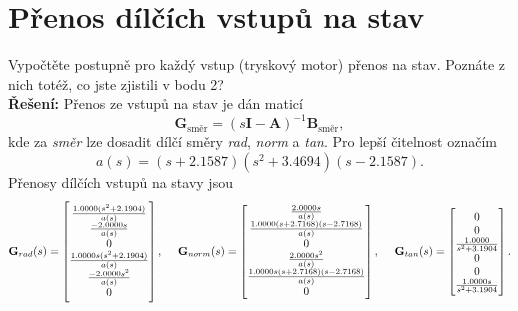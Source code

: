 \documentclass[twoside]{article}
\begin{document}
\section{Přenos dílčích vstupů na stav}
\label{sec:ukol3}
Vypočtěte postupně pro každý vstup (tryskový motor) přenos na stav. Poznáte z nich totéž, co jste zjistili
v bodu 2? \\
\textbf{Řešení:}
Přenos ze vstupů na stav je dán maticí 
\begin{equation}
	\mathbf{G}_{\text{směr}} = (s\mathbf{I}-\mathbf{A})^{-1} \mathbf{B}_{\text{směr}},
	\label{eq:prenos_vztah}
\end{equation}
kde za \textit{směr} lze dosadit dílčí směry \textit{rad}, \textit{norm} a \textit{tan}.
Pro lepší čitelnost označím
\begin{equation*}
	a(s) = (s+2.1587)(s^2+3.4694)(s-2.1587).
\end{equation*}
Přenosy dílčích vstupů na stavy jsou
\begin{equation}
	\label{eq:prenosy}
	\mathbf{G}_{rad}(s) = \begin{bmatrix}
		
		\frac{1.0000(s^2+2.1904)     }{a(s)}          \\                
		\frac{-2.0000s        }{a(s)}                   \\               
		0                                    \\            
		\frac{1.0000s(s^2+2.1904)}{a(s)}              \\
		\frac{-2.0000s^2}{a(s)}                         \\               
		0                                                
	\end{bmatrix}, ~~~~                                                    
		\mathbf{G}_{norm}(s) =                       
		\begin{bmatrix}
			
			\frac{2.0000s}{a(s)}                                               \\
			\frac{1.0000(s+2.7168)(s-2.7168) }{a(s)}                \\           
			0                                        \\             
			\frac{2.0000s^2                  }{a(s)}           \\
			\frac{1.0000s(s+2.7168)(s-2.7168)}{a(s)}             \\              
			0                                                     
		\end{bmatrix}, ~~~~
		\mathbf{G}_{tan}(s) = \begin{bmatrix}
			
			0                              \\   
			0                             \\    
			\frac{1.0000}{s^2+3.1904}     \\       
			0                              \\
			0                               \\   
			\frac{1.0000s}{s^2+3.1904}                           
		\end{bmatrix}.
\end{equation}
\end{document}
